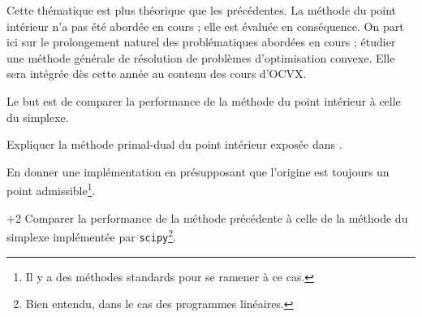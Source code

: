 \documentclass[11pt, a4paper]{article}
\begin{document}
Cette thématique est plus théorique que les précédentes. La méthode du
point intérieur n'a pas été abordée en cours ; elle est évaluée en
conséquence. On part ici sur le prolongement naturel des
problématiques abordées en cours ; étudier une méthode générale de
résolution de problèmes d'optimisation convexe. Elle sera intégrée dès
cette année au contenu des cours d'OCVX.

Le but est de comparer la performance de la méthode du point intérieur
à celle du simplexe.

\begin{question}{4}
  Expliquer la méthode primal-dual du point intérieur exposée
  dans \cite[11.7]{Boyd:2004:CO:993483}.
\end{question}

\begin{question}{6}
  En donner une implémentation en présupposant que l'origine est
  toujours un point admissible\footnote{Il y a des méthodes standards
    pour se ramener à ce cas.}.
\end{question}

\begin{question}{+2}
  Comparer la performance de la méthode précédente à celle de la
  méthode du simplexe implémentée par \texttt{scipy}\footnote{Bien
    entendu, dans le cas des programmes linéaires.}.
\end{question}



\end{document}
